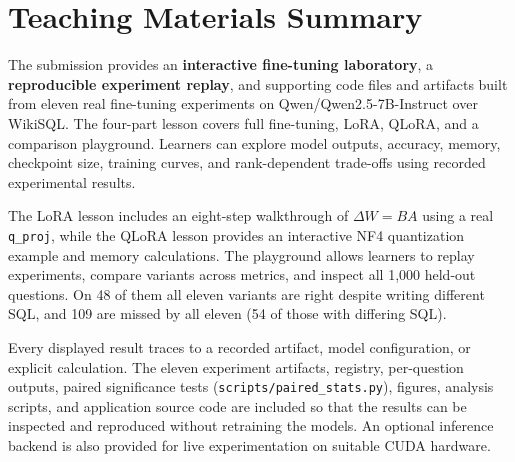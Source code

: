 \documentclass{article}
\begin{document}
\section{Teaching Materials Summary}

The submission provides an \textbf{interactive fine-tuning laboratory}, a \textbf{reproducible experiment replay}, and supporting code files and artifacts built from eleven real fine-tuning experiments on Qwen/Qwen2.5-7B-Instruct over WikiSQL. The four-part lesson covers full fine-tuning, LoRA, QLoRA, and a comparison playground. Learners can explore model outputs, accuracy, memory, checkpoint size, training curves, and rank-dependent trade-offs using recorded experimental results.

The LoRA lesson includes an eight-step walkthrough of $\Delta W = BA$ using a real \texttt{q\_proj}, while the QLoRA lesson provides an interactive NF4 quantization example and memory calculations. The playground allows learners to replay experiments, compare variants across metrics, and inspect all 1,000 held-out questions. On 48 of them all eleven variants are right despite writing different SQL, and 109 are missed by all eleven (54 of those with differing SQL).

Every displayed result traces to a recorded artifact, model configuration, or explicit calculation. The eleven experiment artifacts, registry, per-question outputs, paired significance tests (\texttt{scripts/paired\_stats.py}), figures, analysis scripts, and application source code are included so that the results can be inspected and reproduced without retraining the models. An optional inference backend is also provided for live experimentation on suitable CUDA hardware.
\end{document}
